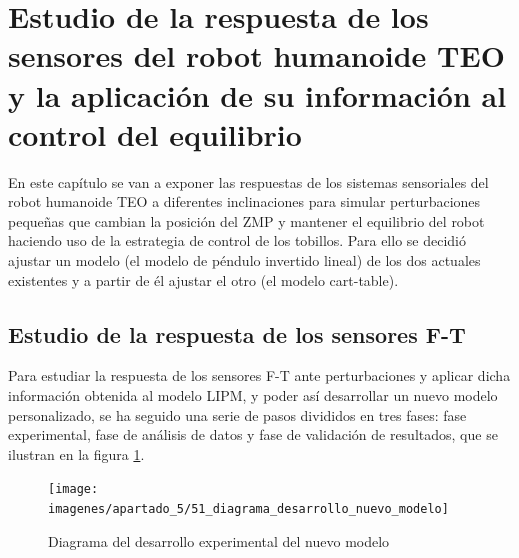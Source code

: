 \section{Estudio de la respuesta de los sensores del robot humanoide TEO y la aplicación de su información al control del equilibrio}

En este capítulo se van a exponer las respuestas de los sistemas sensoriales del robot humanoide TEO a diferentes inclinaciones  para simular perturbaciones pequeñas que cambian la posición del ZMP y mantener el equilibrio del robot haciendo uso de la estrategia de control de los tobillos. Para ello se decidió ajustar un modelo (el modelo de péndulo invertido lineal) de los dos actuales existentes y a partir de él ajustar el otro (el modelo cart-table).

\subsection{Estudio de la respuesta de los sensores F-T}

Para estudiar la respuesta de los sensores F-T ante perturbaciones y aplicar dicha información obtenida al modelo LIPM, y poder así desarrollar un nuevo modelo personalizado, se ha seguido una serie de pasos divididos en tres fases: fase experimental, fase de análisis de datos y fase de validación de resultados, que se ilustran en la figura \ref{figura51}. 

\begin{figure}[H]
\centering
\texttt{[image: imagenes/apartado\_5/51\_diagrama\_desarrollo\_nuevo\_modelo]}
\caption{Diagrama del desarrollo experimental del nuevo modelo}
\label{figura51}
\end{figure}

